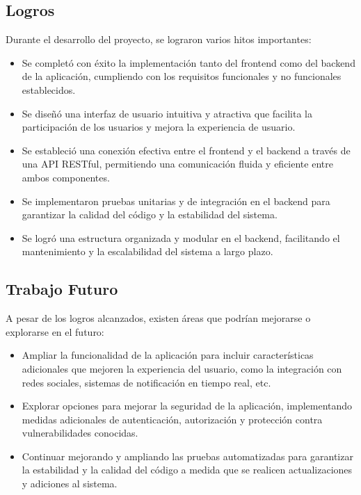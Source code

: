 \documentclass{article}
\begin{document}
\subsection{Logros}

Durante el desarrollo del proyecto, se lograron varios hitos importantes:

\begin{itemize}
    \item Se completó con éxito la implementación tanto del frontend como del backend de la aplicación, cumpliendo con los requisitos funcionales y no funcionales establecidos.
    \item Se diseñó una interfaz de usuario intuitiva y atractiva que facilita la participación de los usuarios y mejora la experiencia de usuario.
    \item Se estableció una conexión efectiva entre el frontend y el backend a través de una API RESTful, permitiendo una comunicación fluida y eficiente entre ambos componentes.
    \item Se implementaron pruebas unitarias y de integración en el backend para garantizar la calidad del código y la estabilidad del sistema.
    \item Se logró una estructura organizada y modular en el backend, facilitando el mantenimiento y la escalabilidad del sistema a largo plazo.
\end{itemize}

\subsection{Trabajo Futuro}

A pesar de los logros alcanzados, existen áreas que podrían mejorarse o explorarse en el futuro:

\begin{itemize}
    \item Ampliar la funcionalidad de la aplicación para incluir características adicionales que mejoren la experiencia del usuario, como la integración con redes sociales, sistemas de notificación en tiempo real, etc.
    \item Explorar opciones para mejorar la seguridad de la aplicación, implementando medidas adicionales de autenticación, autorización y protección contra vulnerabilidades conocidas.
    \item Continuar mejorando y ampliando las pruebas automatizadas para garantizar la estabilidad y la calidad del código a medida que se realicen actualizaciones y adiciones al sistema.
\end{itemize}
\end{document}

